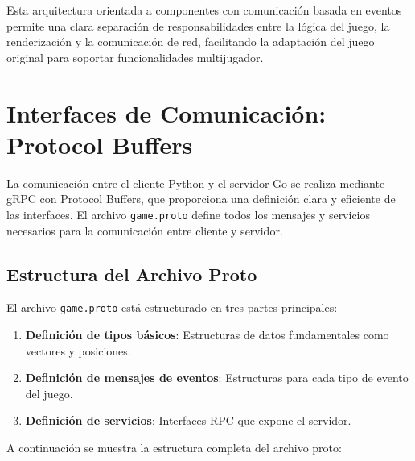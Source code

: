 \documentclass[12pt,letterpaper]{article}
\begin{document}
Esta arquitectura orientada a componentes con comunicación basada en eventos permite una clara separación de responsabilidades entre la lógica del juego, la renderización y la comunicación de red, facilitando la adaptación del juego original para soportar funcionalidades multijugador.

\section{Interfaces de Comunicación: Protocol Buffers}

La comunicación entre el cliente Python y el servidor Go se realiza mediante gRPC con Protocol Buffers, que proporciona una definición clara y eficiente de las interfaces. El archivo \texttt{game.proto} define todos los mensajes y servicios necesarios para la comunicación entre cliente y servidor.

\subsection{Estructura del Archivo Proto}

El archivo \texttt{game.proto} está estructurado en tres partes principales:

\begin{enumerate}
    \item \textbf{Definición de tipos básicos}: Estructuras de datos fundamentales como vectores y posiciones.
    \item \textbf{Definición de mensajes de eventos}: Estructuras para cada tipo de evento del juego.
    \item \textbf{Definición de servicios}: Interfaces RPC que expone el servidor.
\end{enumerate}

A continuación se muestra la estructura completa del archivo proto:
\end{document}
